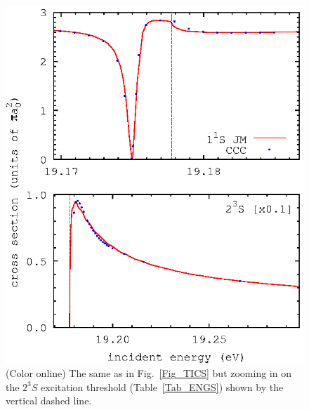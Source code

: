\documentclass[aip
, pra
, showpacs
, aps
, twocolumn
, groupedaddress
, floatfix
]{revtex4}
\begin{document}
\begin{figure}[htb]
\includegraphics[scale=1]{fig_res_1S_2S3.ps}
\caption{(Color online)
The same as in Fig.~\ref{Fig_TICS}
but zooming in on the $2^3S$ excitation threshold (Table~\ref{Tab_ENGS}) shown by the vertical dashed line.
}
\label{Fig_2S3}
\end{figure}
\end{document}
